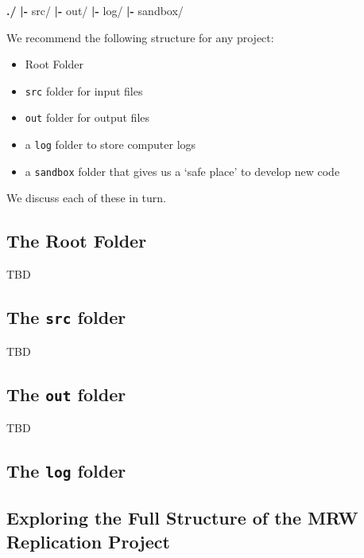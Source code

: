 \documentclass[]{book}
\newenvironment{Shaded}{\begin{snugshade}}{\end{snugshade}}
\newcommand{\KeywordTok}[1]{\textcolor[rgb]{0.13,0.29,0.53}{\textbf{{#1}}}}
\newcommand{\NormalTok}[1]{{#1}}
\providecommand{\tightlist}{%
  \setlength{\itemsep}{0pt}\setlength{\parskip}{0pt}}
\theoremstyle{definition}
\theoremstyle{definition}
\theoremstyle{definition}
\theoremstyle{remark}
\begin{document}
\begin{Shaded}
\begin{Highlighting}[]
\KeywordTok{./}
    \KeywordTok{|-} \NormalTok{src/}
    \KeywordTok{|-} \NormalTok{out/}
    \KeywordTok{|-} \NormalTok{log/}
    \KeywordTok{|-} \NormalTok{sandbox/}
\end{Highlighting}
\end{Shaded}

We recommend the following structure for any project:

\begin{itemize}
\tightlist
\item
  Root Folder
\item
  \texttt{src} folder for input files
\item
  \texttt{out} folder for output files
\item
  a \texttt{log} folder to store computer logs
\item
  a \texttt{sandbox} folder that gives us a `safe place' to develop new
  code
\end{itemize}

We discuss each of these in turn.

\subsection{The Root Folder}\label{the-root-folder}

TBD

\subsection{\texorpdfstring{The \texttt{src}
folder}{The src folder}}\label{the-src-folder}

TBD

\subsection{\texorpdfstring{The \texttt{out}
folder}{The out folder}}\label{the-out-folder}

TBD

\subsection{\texorpdfstring{The \texttt{log}
folder}{The log folder}}\label{the-log-folder}

\subsection{Exploring the Full Structure of the MRW Replication
Project}\label{exploring-the-full-structure-of-the-mrw-replication-project}
\end{document}
